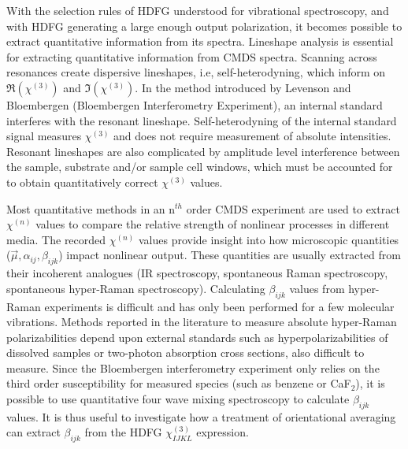 \documentclass[aip, jcp, reprint, onecolumn]{revtex4-2}
\begin{document}
With the selection rules of HDFG understood for vibrational spectroscopy, and with HDFG generating a large enough output polarization, it becomes possible to extract quantitative information from its spectra.
Lineshape analysis is essential for extracting quantitative information from CMDS spectra.
Scanning across resonances create dispersive lineshapes, i.e, self-heterodyning, which inform on $\Re(\chi^{(3)})$ and $\Im(\chi^{(3)})$.\cite{Levenson1974_1, Levenson1974_2}
In the method introduced by Levenson and Bloembergen (Bloembergen Interferometry Experiment), an internal standard interferes with the resonant lineshape.
Self-heterodyning of the internal standard signal measures $\chi^{(3)}$ and does not require measurement of absolute intensities. 
Resonant lineshapes are also complicated by amplitude level interference between the sample,  substrate and/or sample cell windows, which must be accounted for to obtain quantitatively correct $\chi^{(3)}$ values. \cite{RN362, RN418}

Most quantitative methods in an n$^{th}$ order CMDS experiment are used to extract $\chi^{(n)}$ values to compare the relative strength of nonlinear processes in different media. \cite{Zhu87, RN351, RN345}
The recorded $\chi^{(n)}$ values provide insight into how microscopic quantities ($\vec{\mu}, \alpha_{ij}, \beta_{ijk}$) impact nonlinear output.
These quantities are usually extracted from their incoherent analogues (IR spectroscopy, spontaneous Raman spectroscopy, spontaneous hyper-Raman spectroscopy). \cite{Levenson1974_2, RN412, Shoute2005}
Calculating $\beta_{ijk}$ values from hyper-Raman experiments is difficult and has only been performed for a few molecular vibrations. \cite{Xu1997, Shoute2005, Kelley2010}
Methods reported in the literature to measure absolute hyper-Raman polarizabilities depend upon external standards such as hyperpolarizabilities of dissolved samples or two-photon absorption cross sections, also difficult to measure.
Since the Bloembergen interferometry experiment only relies on the third order susceptibility for measured species (such as benzene or CaF$_2$), it is possible to use quantitative four wave mixing spectroscopy to calculate $\beta_{ijk}$ values.
It is thus useful to investigate how a treatment of orientational averaging can extract $\beta_{ijk}$ from the HDFG $\chi^{(3)}_{IJKL}$ expression.
\end{document}
